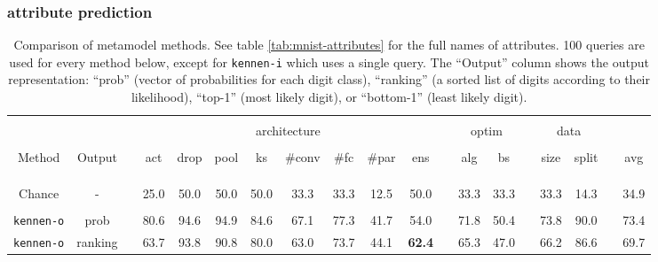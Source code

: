 \documentclass{article} %
\newcommand{\OR}{\texttt{kennen-o}\xspace}
\newcommand{\IC}{\texttt{kennen-i}\xspace}
\begin{document}
\subsubsection*{attribute prediction}

\begin{table}
\footnotesize
\caption{\label{tab:mnist-attr-pred-main}Comparison of metamodel methods. See table \ref{tab:mnist-attributes} for the full names of attributes. 100 queries are used for every method below, except for \IC which uses a single query. The ``Output'' column shows the output representation: ``prob'' (vector of probabilities for each digit class), ``ranking'' (a sorted list of digits according to their likelihood), ``top-1'' (most likely digit), or ``bottom-1'' (least likely digit).}
\vspace{-2em}
\begin{centering}
\setlength{\tabcolsep}{0.25em}
\begin{tabular}{ccc*{8}{c}c*{2}{c}c*{2}{c}c*{1}{c}}
\hspace{-0.8em} & \tabularnewline
 & \hspace{1em} && \multicolumn{8}{c}{architecture} && \multicolumn{2}{c}{optim} && \multicolumn{2}{c}{data} &&\tabularnewline
\cline{4-11} \cline{13-14} \cline{16-17}
\vspace{-1em} &  &  &  &  &  &  & & & \tabularnewline
Method & Output & \hspace{0.5em} & act & drop & pool & ks & \#\ignorespaces conv & \#\ignorespaces fc &\#\ignorespaces par & ens & \hspace{0.5em} & alg & bs &\hspace{0.5em} & size & split & \hspace{0.5em} & avg \tabularnewline
\vspace{-1em} &   \tabularnewline
\cline{1-2} \cline{4-11} \cline{13-14} \cline{16-17} \cline{19-19}     
\vspace{-1em} &   \tabularnewline
\cline{1-2} \cline{4-11} \cline{13-14} \cline{16-17} \cline{19-19}    
\vspace{-0.8em} &   \tabularnewline
Chance&-&&	25.0 & 50.0 & 50.0 & 50.0 & 33.3 & 33.3 & 12.5 & 50.0 &  & 33.3 & 33.3 &  & 33.3 & 14.3 &  & 34.9 \tabularnewline
\cline{1-2} \cline{4-11} \cline{13-14} \cline{16-17} \cline{19-19}   
\vspace{-0.8em} &   \tabularnewline
\OR &prob&& 	80.6 & 94.6 & 94.9 & 84.6 & 67.1 & 77.3 & 41.7 & 54.0 &  & 71.8 & 50.4 &  & 73.8 & 90.0 &  & 73.4\tabularnewline
\OR &ranking&& 	63.7 & 93.8 & 90.8 & 80.0 & 63.0 & 73.7 & 44.1 & {\bf 62.4} &  & 65.3 & 47.0 &  & 66.2 & 86.6 &  & 69.7 \tabularnewline

\end{tabular}
\end{centering}
\end{table}
\end{document}
